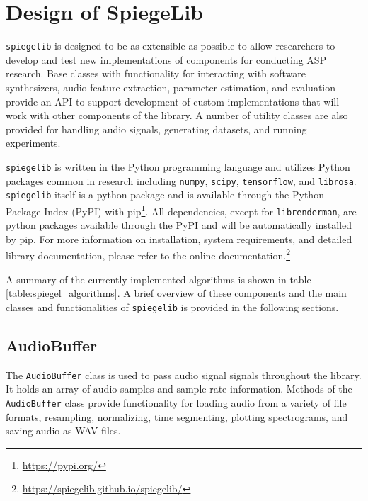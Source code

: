 \section{Design of SpiegeLib}\label{sec:3}
\texttt{spiegelib} is designed to be as extensible as possible to allow researchers to develop and test new implementations of components for conducting ASP research. Base classes with functionality for interacting with software synthesizers, audio feature extraction, parameter estimation, and evaluation provide an API to support development of custom implementations that will work with other components of the library. A number of utility classes are also provided for handling audio signals, generating datasets, and running experiments.

 \texttt{spiegelib} is written in the Python programming language and utilizes Python packages common in research including \texttt{numpy}, \texttt{scipy}, \texttt{tensorflow}, and \texttt{librosa}. \texttt{spiegelib} itself is a python package and is available through the Python Package Index (PyPI) with pip\footnote{\url{https://pypi.org/}}. All dependencies, except for \texttt{librenderman}, are python packages available through the PyPI and will be automatically installed by pip. For more information on installation, system requirements, and detailed library documentation, please refer to the  online documentation.\footnote{\url{https://spiegelib.github.io/spiegelib/}}
 
 A summary of the currently implemented algorithms is shown in table \ref{table:spiegel_algorithms}. A brief overview of these components and the main classes and functionalities of \texttt{spiegelib} is provided in the following sections.
 
\subsection{AudioBuffer}
The \texttt{AudioBuffer} class is used to pass audio signal signals throughout the library. It holds an array of audio samples and sample rate information. Methods of the \texttt{AudioBuffer} class provide functionality for loading audio from a variety of file formats, resampling, normalizing, time segmenting, plotting spectrograms, and saving audio as WAV files.

